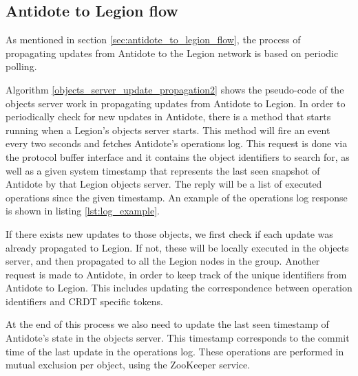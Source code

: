 \subsection{Antidote to Legion flow}
\label{sec:legion_changes_antidote to legion flow}
As mentioned in section \ref{sec:antidote_to_legion_flow}, the process of propagating updates from Antidote to the Legion network is based on periodic polling.\par
	Algorithm \ref{objects_server_update_propagation2} shows the pseudo-code of the objects server work in propagating updates from Antidote to Legion. In order to periodically check for new updates in Antidote, there is a method that starts running when a Legion's objects server starts. This method will fire an event every two seconds and fetches Antidote's operations log. This request is done via the protocol buffer interface and it contains the object identifiers to search for, as well as a given system timestamp that represents the last seen snapshot of Antidote by that Legion objects server. The reply will be a list of executed operations since the given timestamp. An example of the operations log response is shown in listing \ref{lst:log_example}.\par
	If there exists new updates to those objects, we first check if each update was already propagated to Legion. If not, these will be locally executed in the objects server, and then propagated to all the Legion nodes in the group. Another request is made to Antidote, in order to keep track of the unique identifiers from Antidote to Legion. This includes updating the correspondence between operation identifiers and CRDT specific tokens.\par
	At the end of this process we also need to update the last seen timestamp of Antidote's state in the objects server. This timestamp corresponds to the commit time of the last update in the operations log. These operations are performed in mutual exclusion per object, using the ZooKeeper service.
	
